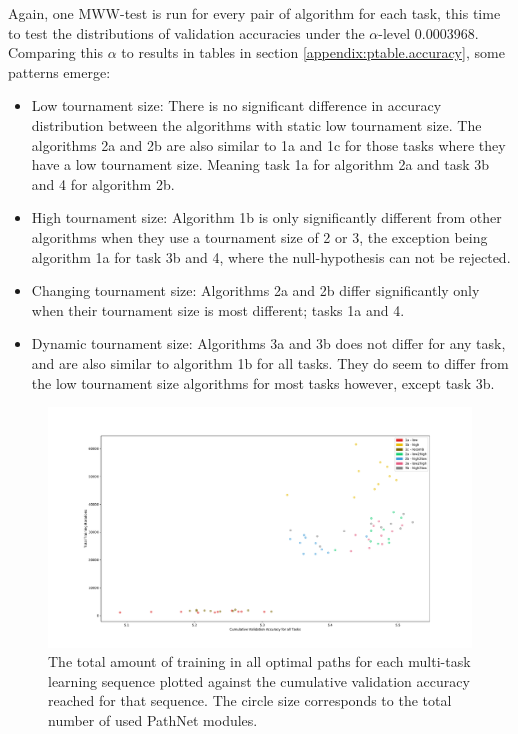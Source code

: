 Again, one MWW-test is run for every pair of algorithm for each task, this time to test the distributions of validation accuracies under the \(\alpha\)-level 0.0003968. Comparing this \(\alpha\) to results in tables in section \ref{appendix:ptable.accuracy}, some patterns emerge: 
\begin{itemize}
    \item Low tournament size: There is no significant difference in accuracy distribution between the algorithms with static low tournament size. The algorithms 2a and 2b are also similar to 1a and 1c for those tasks where they have a low tournament size. Meaning task 1a for algorithm 2a and task 3b and 4 for algorithm 2b. 
    \item High tournament size: Algorithm 1b is only significantly different from other algorithms when they use a tournament size of 2 or 3, the exception being algorithm 1a for task 3b and 4, where the null-hypothesis can not be rejected. 
    \item Changing tournament size: Algorithms 2a and 2b differ significantly only when their tournament size is most different; tasks 1a and 4. 
    \item Dynamic tournament size: Algorithms 3a and 3b does not differ for any task, and are also similar to algorithm 1b for all tasks. They do seem to differ from the low tournament size algorithms for most tasks however, except task 3b. 
\end{itemize}

\begin{figure}
    \includegraphics[width=1.2\textwidth,center]{Chapters/4.Experiments/exp2/figures/large/Training_value.pdf}
    \caption[Training vs cumulative accuracy plot]{The total amount of training in all optimal paths for each multi-task learning sequence plotted against the cumulative validation accuracy reached for that sequence. The circle size corresponds to the total number of used PathNet modules.}
    \label{fig:search.training_value}
\end{figure}

